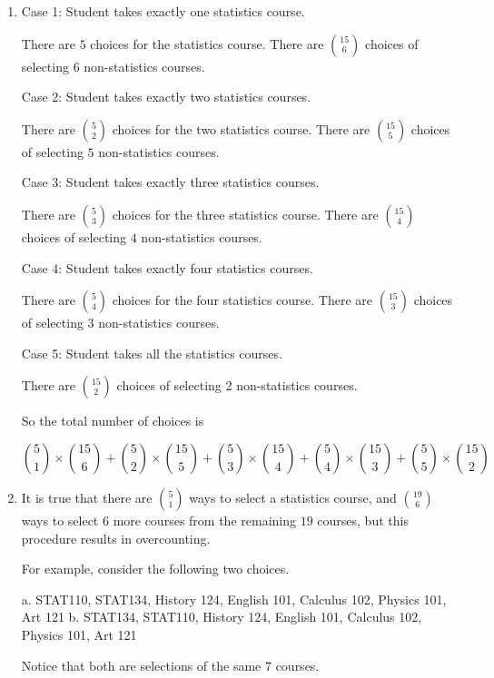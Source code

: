 \begin{enumerate}[label=(\alph*)]
\item Case 1: Student takes exactly one statistics course.
  
  There are $5$ choices for the statistics course. There are ${15 \choose 6}$ choices of selecting $6$ non-statistics courses.
  
  Case 2: Student takes exactly two statistics courses.
  
  There are ${5 \choose 2}$ choices for the two statistics course. There are ${15 \choose 5}$ choices of selecting $5$ non-statistics courses.
  
  Case 3: Student takes exactly three statistics courses.
  
  There are ${5 \choose 3}$ choices for the three statistics course. There are ${15 \choose 4}$ choices of selecting $4$ non-statistics courses.
  
  Case 4: Student takes exactly four statistics courses.
  
  There are ${5 \choose 4}$ choices for the four statistics course. There are ${15 \choose 3}$ choices of selecting $3$ non-statistics courses.
  
  Case 5: Student takes all the statistics courses.
  
  There are ${15 \choose 2}$ choices of selecting $2$ non-statistics courses.
  
  So the total number of choices is
  
  $${5 \choose 1} \times {15 \choose 6} + {5 \choose 2} \times {15 \choose 5} + {5 \choose 3} \times {15 \choose 4} + {5 \choose 4} \times {15 \choose 3} + {5 \choose 5} \times {15 \choose 2}$$

\item It is true that there are ${5 \choose 1}$ ways to select a statistics course, and ${19 \choose 6}$ ways to select $6$ more courses from the remaining $19$ courses, but this procedure results in overcounting.
  
  For example, consider the following two choices.
  
  a. STAT110, STAT134, History 124, English 101, Calculus 102, Physics 101, Art 121
  b. STAT134, STAT110, History 124, English 101, Calculus 102, Physics 101, Art 121
  
  Notice that both are selections of the same $7$ courses.
\end{enumerate}